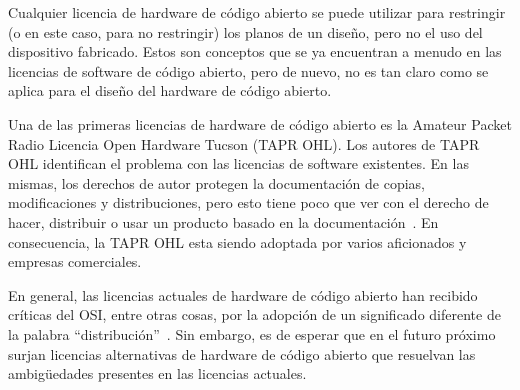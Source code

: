 

Cualquier licencia de hardware de código abierto se puede utilizar
para restringir (o en este caso, para no restringir) los planos de un
diseño, pero no el uso del dispositivo fabricado. Estos son conceptos
que se ya encuentran a menudo en las licencias de software de código 
abierto, pero de nuevo, no es tan claro como se aplica para el diseño
del hardware de código abierto.

Una de las primeras licencias de hardware de código abierto es la
Amateur Packet Radio Licencia Open Hardware Tucson (TAPR OHL). Los
autores de TAPR OHL identifican el problema con las licencias de
software existentes. En las mismas, los derechos de autor protegen la
documentación de copias, modificaciones y distribuciones, pero esto
tiene poco que ver con el derecho de hacer, distribuir o usar un
producto basado en la documentación~\cite{Etiqueta12}. En
consecuencia, la TAPR OHL esta siendo adoptada por varios aficionados
y empresas comerciales.



En general, las licencias actuales de hardware de código abierto han
recibido críticas del OSI, entre otras cosas, por la adopción de un
significado diferente de la palabra
``distribución''~\cite{Etiqueta13}. Sin embargo, es de esperar que en
el futuro próximo surjan licencias alternativas de hardware de código
abierto que resuelvan las ambigüedades presentes en las licencias
actuales.

